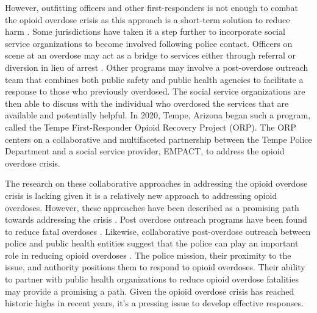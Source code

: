 However, outfitting officers and other first-responders is not enough to combat the opioid overdose crisis as this approach is a short-term solution to reduce harm \parencite{goodison_law_2019}. Some jurisdictions have taken it a step further to incorporate social service organizations to become involved following police contact. Officers on scene at an overdose may act as a bridge to services either through referral or diversion in lieu of arrest \parencite{collins_seattles_2017, paul_meeting_2018}. Other programs may involve a post-overdose outreach team that combines both public safety and public health agencies to facilitate a response to those who previously overdosed. The social service organizations are then able to discuss with the individual who overdosed the services that are available and potentially helpful. In 2020, Tempe, Arizona began such a program, called the Tempe First-Responder Opioid Recovery Project (ORP). The ORP centers on a collaborative and multifaceted partnership between the Tempe Police Department and a social service provider, EMPACT, to address the opioid overdose crisis. 

The research on these collaborative approaches in addressing the opioid overdose crisis is lacking given it is a relatively new approach to addressing opioid overdoses. However, these approaches have been described as a promising path towards addressing the crisis \parencite{haegerich_evidence_2019, yatsco_alternatives_2020}. Post overdose outreach programs have been found to reduce fatal overdoses \parencite{xuan_association_2023}. Likewise, collaborative post-overdose outreach between police and public health entities suggest that the police can play an important role in reducing opioid overdoses \parencite{donnelly_law_2022}. The police mission, their proximity to the issue, and authority positions them to respond to opioid overdoses. Their ability to partner with public health organizations to reduce opioid overdose fatalities may provide a promising a path. Given the opioid overdose crisis has reached historic highs in recent years, it’s a pressing issue to develop effective responses. 

